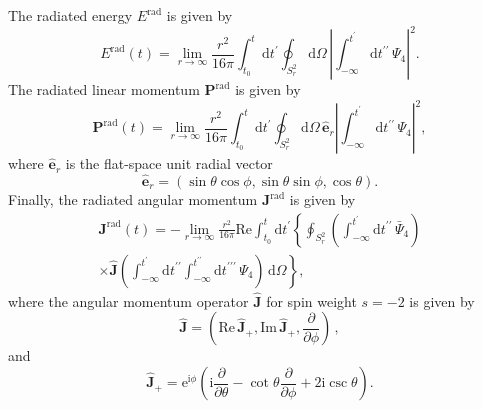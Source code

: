 \documentclass[floats,floatfix,showpacs,amssymb,physrev,twocolumn,superscriptaddress,reprint,
nofootinbib, longbibliography]{revtex4-2}
\newcommand{\rad}{\mathrm{rad}}
\newcommand{\rmd}{\mathrm{d}}
\begin{document}
The radiated energy $E^{\rad}$ is given by
\cite{Campanelli:1998jv,Lousto:2007mh}
\begin{equation}
    E^{\rad}(t) = \lim_{r\to\infty}\frac{r^2}{16\pi}\int_{t_0}^t\rmd t^\prime
    \oint_{S^2_r}\rmd\Omega\,\left|\int_{-\infty}^{t^\prime}\rmd t^{\prime\prime}\,
    \Psi_4\right|^2.\label{eq:Erad}
\end{equation}
The radiated linear momentum $\mathbf{P}^{\rad}$ is given by
\begin{equation}
    \mathbf{P}^{\rad}(t) = \lim_{r\to\infty}\frac{r^2}{16\pi}
    \int_{t_0}^t\rmd t^\prime\oint_{S^2_r}\rmd\Omega\,
    \hat{\mathbf{e}}_r\left|\int_{-\infty}^{t^\prime}\rmd t^{\prime\prime}\,
    \Psi_4\right|^2,\label{eq:Prad}
\end{equation}
where $\hat{\mathbf{e}}_r$ is the flat-space unit radial vector
\begin{equation}
    \hat{\mathbf{e}}_r = (\sin\theta\cos\phi,\sin\theta\sin\phi,\cos\theta).
\end{equation}
Finally, the radiated angular momentum $\mathbf{J}^{\rad}$ is given by
\begin{multline}
    \mathbf{J}^{\rad}(t) = - 
    \lim_{r\to\infty}\frac{r^2}{16\pi}\mathrm{Re}\int_{t_0}^{t}\rmd t^\prime
    \left\{\oint_{S^2_r}\left(\int_{-\infty}^{t^\prime}\rmd t^{\prime\prime}\,
    \bar{\Psi}_4\right)\right.\\
    \left. \times\hat{\mathbf{J}}\left(\int_{-\infty}^{t^\prime}
    \rmd t^{\prime\prime}\int_{-\infty}^{t^{\prime\prime}}
    \rmd t^{\prime\prime\prime}\,\Psi_4\right)\,\rmd\Omega\right\},
    \label{eq:Jrad}
\end{multline}
where the angular momentum operator $\hat{\mathbf{J}}$ for spin weight 
$s=-2$ is given by
\begin{equation}
    \hat{\mathbf{J}}=\left(\mathrm{Re}\,\hat{\mathbf{J}}_+,\mathrm{Im}\,
    \hat{\mathbf{J}}_+,\frac{\partial}{\partial\phi}\right)\,,
\end{equation}
and
\begin{equation}
    \hat{\mathbf{J}}_+=\mathrm{e}^{\mathrm{i}\phi}\left(\mathrm{i}
    \frac{\partial}{\partial\theta} - \cot\theta\frac{\partial}{\partial\phi} 
    + 2\mathrm{i}\csc\theta\right).
\end{equation}
\end{document}
